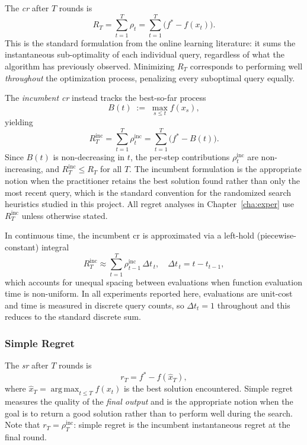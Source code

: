 The \textit{\acrfull{cr}} after $T$ rounds is~\cite{cesa2006prediction}
\[
  R_T = \sum_{t=1}^{T} \rho_t = \sum_{t=1}^{T} \bigl(f^{*} - f(x_t)\bigr).
\]
This is the standard formulation from the online learning literature:
it sums the
instantaneous sub-optimality of each individual query, regardless of
what the algorithm
has previously observed. Minimizing $R_T$ corresponds to performing well
\textit{throughout} the optimization process, penalizing every
suboptimal query equally.

The \textit{incumbent \acrshort{cr}} instead tracks the best-so-far process
\[
  B(t) \;:=\; \max_{s \leq t} f(x_s),
\]
yielding
\[
  R^{\mathrm{inc}}_T = \sum_{t=1}^{T} \rho^{\mathrm{inc}}_t = \sum_{t=1}^{T}
  \bigl(f^{*} - B(t)\bigr).
\]
Since $B(t)$ is non-decreasing in $t$, the per-step contributions
$\rho^{\mathrm{inc}}_t$ are non-increasing, and $R^{\mathrm{inc}}_T
\leq R_T$ for all
$T$. The incumbent formulation is the appropriate notion when the
practitioner retains
the best solution found rather than only the most recent query, which
is the standard
convention for the randomized search heuristics studied in this
project. All regret
analyses in Chapter~\ref{cha:exper} use $R^{\mathrm{inc}}_T$ unless
otherwise stated.

In continuous time, the incumbent \acrshort{cr} is approximated
via a left-hold
(piecewise-constant) integral
\[
  R^{\mathrm{inc}}_T \approx \sum_{t=1}^{T}
  \rho^{\mathrm{inc}}_{t-1}\,\Delta t_{\,t},
  \quad \Delta t_{\,t} = t - t_{t-1},
\]
which accounts for unequal spacing between evaluations when function
evaluation time is
non-uniform. In all experiments reported here, evaluations are
unit-cost and time is
measured in discrete query counts, so $\Delta t_t = 1$ throughout and
this reduces to
the standard discrete sum.

\subsubsection{Simple Regret}
\label{subsubsec:sr}
The \textit{\acrfull{sr}} after $T$ rounds is~\cite{bubeck2011pure}
\[
  r_T = f^{*} - f(\hat{x}_T),
\]
where $\hat{x}_T = \operatorname{arg\,max}_{t \leq T} f(x_t)$ is the
best solution
encountered. Simple regret measures the quality of the \textit{final
output} and is the
appropriate notion when the goal is to return a good solution rather
than to perform well
during the search. Note that $r_T = \rho^{\mathrm{inc}}_T$: simple
regret is the incumbent instantaneous regret at the final round.

